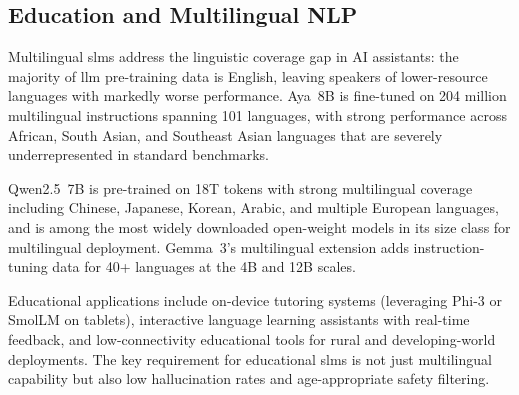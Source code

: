 \subsection{Education and Multilingual NLP}
\label{subsec:applications_multilingual}

Multilingual \glspl{slm} address the linguistic coverage gap in AI assistants: the majority of \gls{llm} pre-training data is English, leaving speakers of lower-resource languages with markedly worse performance. Aya~8B \citep{ustun2024aya} is fine-tuned on 204 million multilingual instructions spanning 101 languages, with strong performance across African, South Asian, and Southeast Asian languages that are severely underrepresented in standard benchmarks.

Qwen2.5~7B \citep{qwen2024qwen25} is pre-trained on 18T tokens with strong multilingual coverage including Chinese, Japanese, Korean, Arabic, and multiple European languages, and is among the most widely downloaded open-weight models in its size class for multilingual deployment. Gemma~3's multilingual extension \citep{team2025gemma3} adds instruction-tuning data for 40+ languages at the 4B and 12B scales.

Educational applications include on-device tutoring systems (leveraging Phi-3 or SmolLM on tablets), interactive language learning assistants with real-time feedback, and low-connectivity educational tools for rural and developing-world deployments. The key requirement for educational \glspl{slm} is not just multilingual capability but also low hallucination rates and age-appropriate safety filtering.
